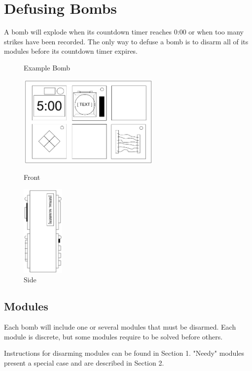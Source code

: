 \documentclass{../../ktane-mod}
\begin{document}
\section*{Defusing Bombs}
A bomb will explode when its countdown timer reaches 0:00 or when too
many strikes have been recorded. The only way to defuse a bomb is to disarm
all of its modules before its countdown timer expires.

\begin{figure}[h]
  \centering
  \caption*{Example Bomb}
  \begin{minipage}{.4\textwidth}
    \centering
    \includegraphics[height=4.5cm]{images/bomb_front}
    \caption*{Front}
    \label{fig:sub1}
  \end{minipage}%
  \begin{minipage}{.3\textwidth}
    \centering
    \includegraphics[height=4.5cm]{images/bomb_side}
    \caption*{Side}
    \label{fig:sub2}
  \end{minipage}
  \label{fig:example_bomb}
\end{figure}

\subsection*{Modules}
Each bomb will include one or several modules that must be disarmed. Each
module is discrete, but some modules require to be solved before others.


Instructions for disarming modules can be found in Section 1.
"Needy" modules present a special case and are described in Section 2.
\end{document}

